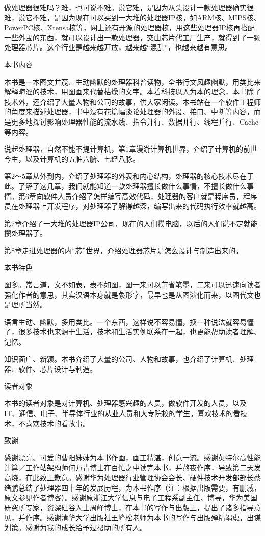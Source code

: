 \documentclass[12pt,UTF8]{ctexbook}
\begin{document}
做处理器很难吗？难，也可说不难。说它难，是因为从头设计一款处理器确实很难，说它不难，是因为现在可以买到一大堆的处理器IP核，如ARM核、MIPS核、PowerPC核、Xtensa核等，网上还有开源的处理器核，用这些处理器IP核再搭配一些外围的东西，就可以设计出一款处理器，交由芯片代工厂生产，就得到了一颗处理器芯片。这个行业是越来越开放，越来越“混乱”，也越来越有意思。

本书内容

本书是一本图文并茂、生动幽默的处理器科普读物，全书行文风趣幽默，用类比来解释晦涩的技术，用图画来代替枯燥的文字。本着科技以人为本的理念，本书除了技术外，还介绍了大量人物和公司的故事，供大家闲读。本书站在一个软件工程师的角度来描述处理器，书中没有花篇幅谈论处理器的外设、接口、中断等内容，而是更多地探讨影响处理器性能的流水线、指令并行、数据并行、线程并行、Cache等内容。

说起处理器，自然不能不提计算机，第1章漫游计算机世界，介绍了计算机的前世今生，以及计算机的五脏六腑、七经八脉。

第2～5章从外到内，介绍了处理器的外表和内心结构，处理器的核心技术尽在于此。了解了这几章，我们就能知道一款处理器擅长做什么事情，不擅长做什么事情。第6章向软件人员介绍了怎样编写高效代码，处理器的客户就是程序员，程序员在处理器上开发程序，对处理器了解得越深，编写出来的代码执行效率就越高。

第7章介绍了一大堆的处理器IP公司，现在的人们攒电脑，以后的人们说不定就能攒处理器了。

第8章走进处理器的内“芯”世界，介绍处理器芯片是怎么设计与制造出来的。

本书特色

图多。常言道，文不如表，表不如图，图一来可以节省笔墨，二来可以迅速向读者强化作者的意思，其实汉语本身就是象形字，最早也是从图演化而来，以图代文也是理所当然。

语言生动、幽默，多用类比。一个东西，这样说不容易懂，换一种说法就容易懂了，很多技术也来源于生活，技术和生活实例联系在一起，也更能帮助读者理解、记忆。

知识面广、新颖。本书介绍了大量的公司、人物和故事，也介绍了计算机、处理器、软件、芯片设计与制造。

读者对象

本书的读者对象是对计算机、处理器感兴趣的人员，做软件开发的人员，以及IT、通信、电子、半导体行业的从业人员和大专院校的学生。喜欢技术的看技术，不喜欢技术的看故事。

致谢

感谢漂亮、可爱的曹阳妹妹为本书作画，画工精湛，创意一流。感谢英特尔高性能计算／工作站架构师何万青博士在百忙之中读完本书，并熬夜作序，导致第二天发高烧，在此致上歉意。感谢华为处理器行业管理协会会长、硬件技术开发部部长蔡绪鹏总结了处理器四十年的发展历程，为本书作序（注：根据出版需要，有删减，原文参见作者博客）。感谢原浙江大学信息与电子工程系副主任、博导，华为美国研究所专家，资深硅谷人士周峰博士，在本书的写作与出版上，提出了诸多指导意见，并作序。感谢清华大学出版社王峰松老师为本书的写作与出版殚精竭虑，出谋划策。感谢为我的成长给予过帮助的所有人。
\end{document}
